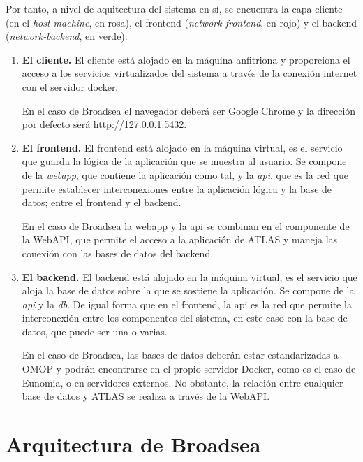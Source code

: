 Por tanto, a nivel de aquitectura del sistema en sí, se encuentra la capa cliente (en el \textit{host machine}, en rosa), el frontend (\textit{network-frontend}, en rojo) y el backend (\textit{network-backend}, en verde).

\begin{enumerate}

    \item \textbf{El cliente.} El cliente está alojado en la máquina anfitriona y proporciona el acceso a los servicios virtualizados del sistema a través de la conexión internet con el servidor docker.

     En el caso de Broadsea el navegador deberá ser Google Chrome y la dirección por defecto será http://127.0.0.1:5432.

    \item \textbf{El frontend.} El frontend está alojado en la máquina virtual, es el servicio que guarda la lógica de la aplicación que se muestra al usuario. Se compone de la \textit{webapp}, que contiene la aplicación como tal, y la \textit{api}. que es la red que permite establecer interconexiones entre la aplicación lógica y la base de datos; entre el frontend y el backend.

    En el caso de Broadsea la webapp y la api se combinan en el componente de la WebAPI, que permite el acceso a la aplicación de ATLAS y maneja las conexión con las bases de datos del backend.

    \item \textbf{El backend.} El backend está alojado en la máquina virtual, es el servicio que aloja la base de datos sobre la que se sostiene la aplicación. Se compone de la \textit{api} y la \textit{db}. De igual forma que en el frontend, la api es la red que permite la interconexión entre los componentes del sistema, en este caso con la base de datos, que puede ser una o varias.

    En el caso de Broadsea, las bases de datos deberán estar estandarizadas a OMOP y podrán encontrarse en el propio servidor Docker, como es el caso de Eunomia, o en servidores externos. No obstante, la relación entre cualquier base de datos y ATLAS se realiza a través de la WebAPI.

    
\end{enumerate}

\section{Arquitectura de Broadsea} \label{sec:08Broadsea}

